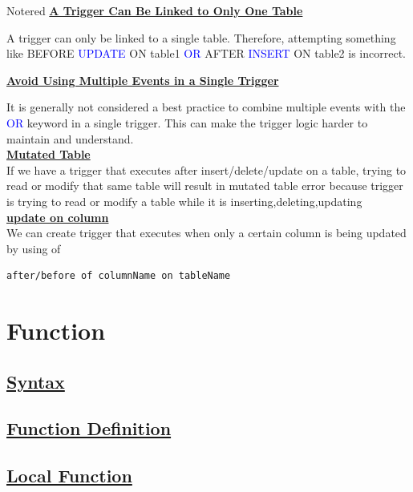 \begin{prettyBox}{Note}{red}
\textbf{\underline{A Trigger Can Be Linked to Only One Table}}

\vspace{0.15cm}
A trigger can only be linked to a single table. Therefore, attempting something like 
BEFORE \textcolor{blue}{UPDATE} ON table1 \textcolor{blue}{OR} AFTER \textcolor{blue}{INSERT} ON table2 is incorrect.

\vspace{0.25cm}

\textbf{\underline{Avoid Using Multiple Events in a Single Trigger}}

\vspace{0.15cm}
It is generally not considered a best practice to combine multiple events with the \textcolor{blue}{OR} keyword in a single trigger. This can make the trigger logic harder to maintain and understand.\\[0.15cm]
\textbf{\underline{Mutated Table}}\\[0.15cm]
If we have a trigger that executes after insert/delete/update on a table, trying to read or modify that same table will result in mutated table error because trigger is trying to read or modify a table while it is inserting,deleting,updating\\[0.25cm]
\textbf{\underline{update on column}}\\[0.15cm]
We can create trigger that executes when only a certain column is being updated by using of
\begin{lstlisting}
after/before of columnName on tableName
\end{lstlisting}
\end{prettyBox}

\newpage
\section{Function}


\subsection*{\underline{Syntax}}

\subsection*{\underline{Function Definition}}

\subsection*{\underline{Local Function}}



